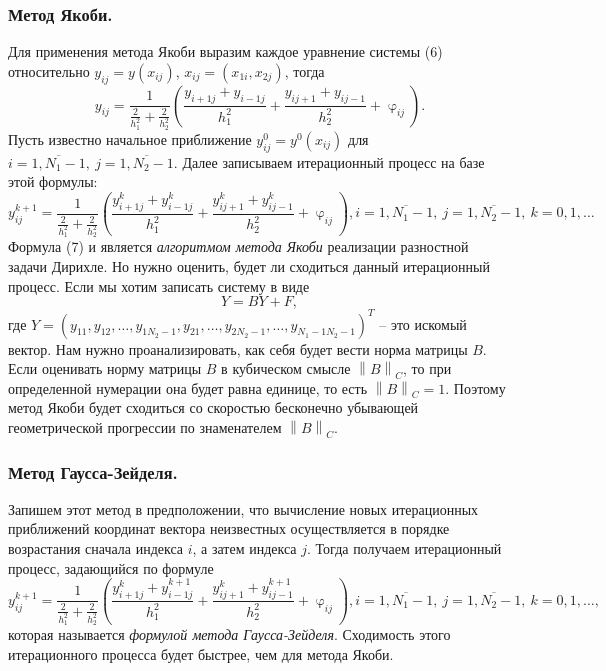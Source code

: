 \documentclass[a4paper, 12pt]{report}
\numberwithin{equation}{section}
\newcommand{\ol}{\overline}
\renewcommand{\varphi}{\upvarphi}
\newcommand\Norm[1]{\left\| #1 \right\|}
\begin{document}
	\subsubsection{Метод Якоби.}
	Для применения метода Якоби выразим каждое уравнение системы (6) относительно $y_{ij} = y(x_{ij})$, $x_{ij} = (x_{1i}, x_{2j})$, тогда
	$$y_{ij} = \dfrac{1}{\frac{2}{h_1^2} + \frac{2}{h_2^2}}\left(\dfrac{y_{i+1 j} + y_{i-1j}}{h_1^2} + \dfrac{y_{i j+1} + y_{ij-1}}{h_2^2} + \varphi_{ij}\right).$$
	Пусть известно начальное приближение $y_{ij}^0 = y^0(x_{ij})$ для $i=\ol{1, N_1-1},\ j = \ol{1, N_2-1}$. Далее записываем итерационный процесс на базе этой формулы:
	\begin{equation}
		y_{ij}^{k+1} = \dfrac{1}{\frac{2}{h_1^2} + \frac{2}{h_2^2}}\left(\dfrac{y_{i+1 j}^k + y_{i-1j}^k}{h_1^2} + \dfrac{y_{i j+1}^k + y_{ij-1}^k}{h_2^2} + \varphi_{ij}\right), i=\ol{1, N_1-1},\ j = \ol{1, N_2-1},\ k = 0,1,\ldots
	\end{equation}
	Формула (7) и является \textit{алгоритмом метода Якоби} реализации разностной задачи Дирихле. Но нужно оценить, будет ли сходиться данный итерационный процесс. Если мы хотим записать систему в виде
	$$Y = BY + F,$$
	где $Y = (y_{11}, y_{12},\ldots, y_{1N_2-1}, y_{21},\ldots, y_{2N_2-1},\ldots, y_{N_1-1N_2-1})^T$ -- это искомый вектор. Нам нужно проанализировать, как себя будет вести норма матрицы $B$. Если оценивать норму матрицы $B$ в кубическом смысле $\Norm{B}_C$, то при определенной нумерации она будет равна единице, то есть $\Norm{B}_C=1$. Поэтому метод Якоби будет сходиться со скоростью бесконечно убывающей геометрической прогрессии по знаменателем $\Norm{B}_C$.
	\subsubsection{Метод Гаусса-Зейделя.}
	Запишем этот метод в предположении, что вычисление новых итерационных приближений координат вектора неизвестных осуществляется в порядке возрастания сначала индекса $i$, а затем индекса $j$. Тогда получаем итерационный процесс, задающийся по формуле 
	\begin{equation}
		y_{ij}^{k+1} = \dfrac{1}{\frac{2}{h_1^2} + \frac{2}{h_2^2}}\left(\dfrac{y_{i+1 j}^k + y_{i-1j}^{k+1}}{h_1^2} + \dfrac{y_{i j+1}^k + y_{ij-1}^{k+1}}{h_2^2} + \varphi_{ij}\right), i=\ol{1, N_1-1},\ j = \ol{1, N_2-1},\ k = 0,1,\ldots,
	\end{equation}
	которая называется \textit{формулой метода Гаусса-Зейделя}. Сходимость этого итерационного процесса будет быстрее, чем для метода Якоби.
\end{document}
